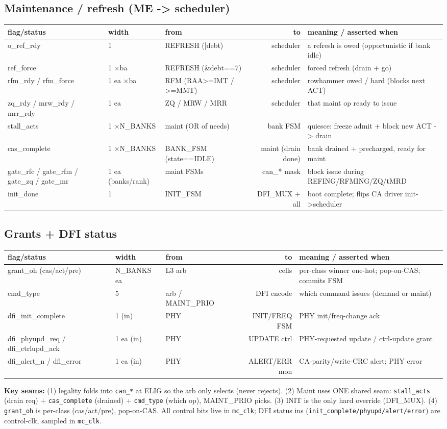 \documentclass[9pt]{extarticle}
\newenvironment{flag}{%
  \footnotesize\begin{longtable}{EHJNU}
  \rowcolor{hb}\textbf{flag/status} & \textbf{width} & \textbf{from} & \textbf{to} & \textbf{meaning / asserted when}\\ \midrule\endhead}
  {\bottomrule\end{longtable}}
\begin{document}
\subsection*{Maintenance / refresh (ME -> scheduler)}
\begin{flag}
o\_ref\_rdy & 1 & REFRESH (|debt) & scheduler & a refresh is owed (opportunistic if bank idle)\\
ref\_force & 1 $\times$ba & REFRESH (\&debt==7) & scheduler & forced refresh (drain + go)\\
rfm\_rdy / rfm\_force & 1 ea $\times$ba & RFM (RAA>=IMT / >=MMT) & scheduler & rowhammer owed / hard (blocks next ACT)\\
zq\_rdy / mrw\_rdy / mrr\_rdy & 1 ea & ZQ / MRW / MRR & scheduler & that maint op ready to issue\\
stall\_acts & 1 $\times$N\_BANKS & maint (OR of needs) & bank FSM & quiesce: freeze admit + block new ACT -> drain\\
cas\_complete & 1 $\times$N\_BANKS & BANK\_FSM (state==IDLE) & maint (drain done) & bank drained + precharged, ready for maint\\
gate\_rfc / gate\_rfm / gate\_zq / gate\_mr & 1 ea (banks/rank) & maint FSMs & can\_* mask & block issue during REFING/RFMING/ZQ/tMRD\\
init\_done & 1 & INIT\_FSM & DFI\_MUX + all & boot complete; flips CA driver init->scheduler\\
\end{flag}
\subsection*{Grants + DFI status}
\begin{flag}
grant\_oh (cas/act/pre) & N\_BANKS ea & L3 arb & cells & per-class winner one-hot; pop-on-CAS; commits FSM\\
cmd\_type & 5 & arb / MAINT\_PRIO & DFI encode & which command issues (demand or maint)\\
dfi\_init\_complete & 1 (in) & PHY & INIT/FREQ FSM & PHY init/freq-change ack\\
dfi\_phyupd\_req / dfi\_ctrlupd\_ack & 1 ea (in) & PHY & UPDATE ctrl & PHY-requested update / ctrl-update grant\\
dfi\_alert\_n / dfi\_error & 1 ea (in) & PHY & ALERT/ERR mon & CA-parity/write-CRC alert; PHY error\\
\end{flag}

\vspace{2pt}
{\footnotesize \textbf{Key seams:} (1) legality folds into \texttt{can\_*} at ELIG so the arb only
selects (never rejects). (2) Maint uses ONE shared seam: \texttt{stall\_acts} (drain req) +
\texttt{cas\_complete} (drained) + \texttt{cmd\_type} (which op), MAINT\_PRIO picks. (3) INIT is the
only hard override (DFI\_MUX). (4) \texttt{grant\_oh} is per-class (cas/act/pre), pop-on-CAS. All
control bits live in \texttt{mc\_clk}; DFI status ins (\texttt{init\_complete/phyupd/alert/error}) are
control-clk, sampled in \texttt{mc\_clk}.}
\end{document}
